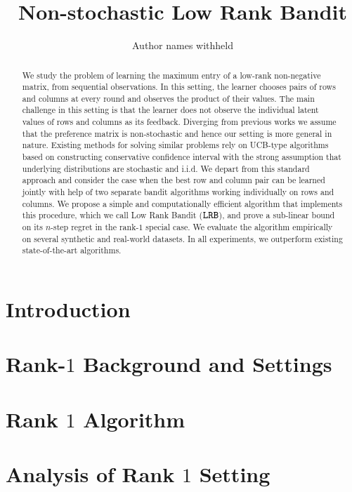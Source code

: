 \documentclass{article}
\title{Non-stochastic Low Rank Bandit}
\author{Author names withheld}
\newcommand{\latentranker}{{\tt LRB}}
\begin{document}
\maketitle
\begin{abstract}
We study the problem of learning the maximum entry of a low-rank non-negative matrix, from sequential observations. In this setting, the learner chooses pairs of rows and columns at every round and observes the product of their values. The main challenge in this setting is that the learner does not observe the individual latent values of rows and columns as its feedback. Diverging from previous works we assume that the preference matrix is non-stochastic and hence our setting is more general in nature. Existing methods for solving similar problems rely on UCB-type algorithms based on constructing conservative confidence interval with the strong assumption that underlying distributions are stochastic and i.i.d. We depart from this standard approach and consider the case when the best row and column pair can be learned jointly with help of two separate bandit algorithms working individually on rows and columns. We propose a simple and computationally efficient algorithm that implements this procedure, which we call Low Rank Bandit ($\latentranker$), and prove a sub-linear bound on its $n$-step regret in the rank-$1$ special case. We evaluate the algorithm empirically on several synthetic and real-world datasets. In all experiments, we outperform existing state-of-the-art algorithms.
\end{abstract}

\section{Introduction}
\label{sec:introduction}


\section{Rank-$1$ Background and Settings}
\label{sec:background}


\section{Rank $1$ Algorithm}
\label{sec:rank1}



\section{Analysis of Rank $1$ Setting}
\label{sec:analysis}

\end{document}
